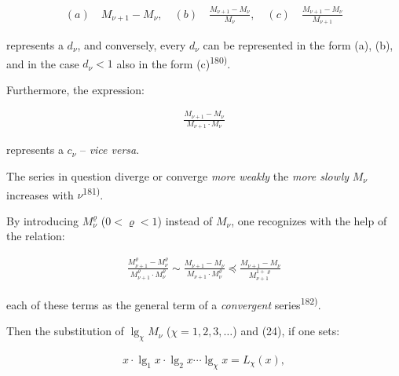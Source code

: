 \thispagestyle{fancy}

\vspace{0.5cm}

\vspace{-0.5cm}
\begin{align}
    (a) \quad M_{\nu+1} - M_\nu, \quad (b) \quad \frac{M_{\nu+1} - M_\nu}{M_\nu}, \quad (c) \quad \frac{M_{\nu+1} - M_\nu}{M_{\nu+1}}
\end{align}
\vspace{-0.3cm}

represents a $d_\nu$, and conversely, every $d_\nu$ can be represented in the form (a), (b), and in the case $d_\nu < 1$ also in the form (c)\textsuperscript{180)}.

Furthermore, the expression:

\vspace{-0.5cm}
\begin{align}
    \frac{M_{\nu+1} - M_\nu}{M_{\nu+1} \cdot M_\nu}
\end{align}
\vspace{-0.5cm}

represents a $c_\nu$ -- \textit{vice versa}.

The series in question diverge or converge \textit{more weakly} the \textit{more slowly} $M_\nu$ increases with $\nu$\textsuperscript{181)}.

By introducing $M_\nu^\varrho$ ($0 < \varrho < 1$) instead of $M_\nu$, one recognizes with the help of the relation:

\vspace{-0.5cm}
\begin{align}
    \frac{M_{\nu+1}^\varrho - M_\nu^\varrho}{M_{\nu+1}^\varrho \cdot M_\nu^\varrho} \sim \frac{M_{\nu+1} - M_\nu}{M_{\nu+1} \cdot M_\nu^\varrho} \preceq \frac{M_{\nu+1} - M_\nu}{M_{\nu+1}^{1+\varrho}}
\end{align}
\vspace{-0.3cm}

each of these terms as the general term of a \textit{convergent} series\textsuperscript{182)}.

Then the substitution of $\lg_\chi M_\nu$ ($\chi = 1, 2, 3, \ldots$) and (24), if one sets:

\vspace{-0.5cm}
\begin{align}
    x \cdot \lg_1 x \cdot \lg_2 x \cdots \lg_\chi x = L_\chi(x),
\end{align}
\vspace{-0.5cm}

